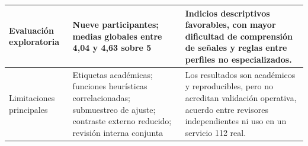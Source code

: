 \begin{table}[p]
\begin{tabularx}{\textwidth}{|>{\RaggedRight\arraybackslash}p{3.0cm}|>{\RaggedRight\arraybackslash}p{4.2cm}|>{\RaggedRight\arraybackslash}X|}
Evaluación exploratoria & Nueve participantes; medias globales entre 4,04 y 4,63 sobre 5 & Indicios descriptivos favorables, con mayor dificultad de comprensión de señales y reglas entre perfiles no especializados. \\ \hline
Limitaciones principales & Etiquetas académicas; funciones heurísticas correlacionadas; submuestreo de ajuste; contraste externo reducido; revisión interna conjunta & Los resultados son académicos y reproducibles, pero no acreditan validación operativa, acuerdo entre revisores independientes ni uso en un servicio 112 real. \\ \hline
\end{tabularx}
\end{table}
\clearpage
